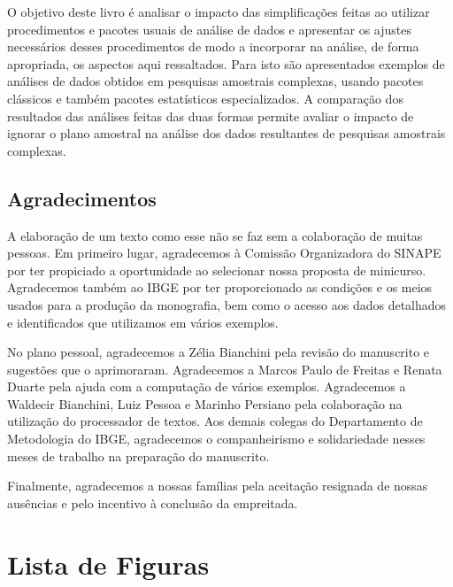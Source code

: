 \documentclass[
  12pt,
  brazilian,
]{book}
\theoremstyle{definition}
\theoremstyle{definition}
\theoremstyle{definition}
\theoremstyle{definition}
\theoremstyle{remark}
\begin{document}
O objetivo deste livro é analisar o impacto das simplificações feitas ao utilizar procedimentos e pacotes usuais de análise de dados e apresentar os ajustes necessários desses procedimentos de modo a incorporar na análise, de forma apropriada, os aspectos aqui ressaltados. Para isto são apresentados exemplos de análises de dados obtidos em pesquisas amostrais complexas, usando pacotes clássicos e também pacotes estatísticos especializados. A comparação
dos resultados das análises feitas das duas formas permite avaliar o impacto de ignorar o plano amostral na análise dos dados resultantes de pesquisas amostrais complexas.

\hypertarget{agradecimentos}{%
\section*{Agradecimentos}\label{agradecimentos}}

A elaboração de um texto como esse não se faz sem a colaboração de muitas pessoas. Em primeiro lugar, agradecemos à Comissão Organizadora do SINAPE por ter propiciado a oportunidade ao selecionar nossa proposta de minicurso. Agradecemos também ao IBGE por ter proporcionado as condições e os meios usados para a produção da monografia, bem como o acesso aos dados detalhados e identificados que utilizamos em vários exemplos.

No plano pessoal, agradecemos a Zélia Bianchini pela revisão do manuscrito e sugestões que o aprimoraram. Agradecemos a Marcos Paulo de Freitas e Renata Duarte pela ajuda com a computação de vários exemplos. Agradecemos a Waldecir Bianchini, Luiz Pessoa e Marinho Persiano pela colaboração na utilização do processador de textos. Aos demais colegas do Departamento de Metodologia do IBGE, agradecemos o companheirismo e solidariedade nesses meses de trabalho na preparação do manuscrito.

Finalmente, agradecemos a nossas famílias pela aceitação resignada de nossas ausências e pelo incentivo à conclusão da empreitada.

\hypertarget{lista-de-figuras}{%
\chapter*{Lista de Figuras}\label{lista-de-figuras}}
\end{document}
